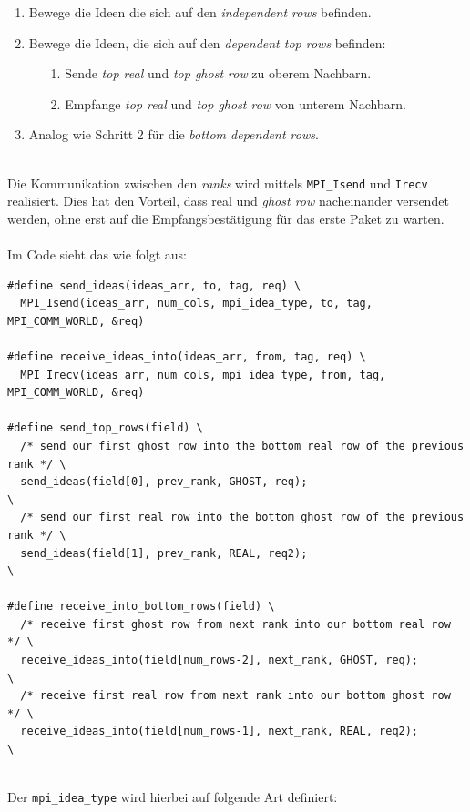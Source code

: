 \begin{enumerate}
	\item Bewege die Ideen die sich auf den \textit{independent rows} befinden.
	\item Bewege die Ideen, die sich auf den \textit{dependent top rows} befinden:
	\begin{enumerate}
  		\item[1.] Sende \textit{top real} und \textit{top ghost row} zu oberem Nachbarn.
  		\item[2.] Empfange \textit{top real} und \textit{top ghost row} von unterem Nachbarn.
	\end{enumerate}
	\item Analog wie Schritt 2 für die \textit{bottom dependent rows}.
\end{enumerate}
\quad \\
Die Kommunikation zwischen den \textit{ranks} wird mittels \texttt{MPI\_Isend} und \texttt{Irecv} realisiert. Dies hat den Vorteil, dass real und \textit{ghost row} nacheinander versendet werden, ohne erst auf die Empfangsbestätigung für das erste Paket zu warten. \\ 
\newpage
\quad \\
Im Code sieht das wie folgt aus: \\
\begin{verbatim}
#define send_ideas(ideas_arr, to, tag, req) \
  MPI_Isend(ideas_arr, num_cols, mpi_idea_type, to, tag, MPI_COMM_WORLD, &req) 

#define receive_ideas_into(ideas_arr, from, tag, req) \
  MPI_Irecv(ideas_arr, num_cols, mpi_idea_type, from, tag, MPI_COMM_WORLD, &req) 

#define send_top_rows(field) \
  /* send our first ghost row into the bottom real row of the previous rank */ \
  send_ideas(field[0], prev_rank, GHOST, req);                                 \
  /* send our first real row into the bottom ghost row of the previous rank */ \
  send_ideas(field[1], prev_rank, REAL, req2);                                 \

#define receive_into_bottom_rows(field) \
  /* receive first ghost row from next rank into our bottom real row */ \
  receive_ideas_into(field[num_rows-2], next_rank, GHOST, req);         \
  /* receive first real row from next rank into our bottom ghost row */ \
  receive_ideas_into(field[num_rows-1], next_rank, REAL, req2);         \
\end{verbatim}
\quad \\
Der \texttt{mpi\_idea\_type} wird hierbei auf folgende Art definiert: \\
